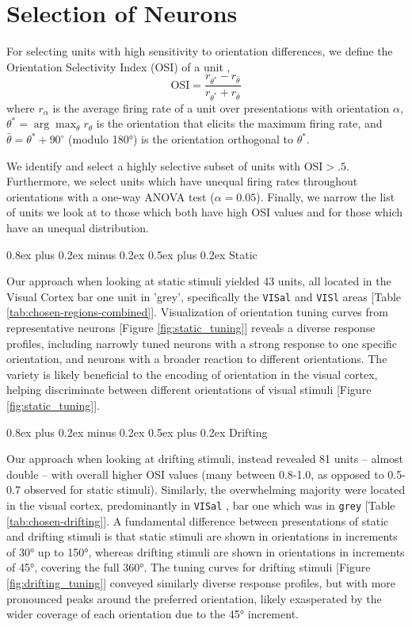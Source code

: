 \documentclass[10pt,twocolumn]{article}
\makeatletter
\renewcommand{\subsection}{\@startsection{subsection}{2}{\z@}%
  {0.8ex plus 0.2ex minus 0.2ex}%
  {0.5ex plus 0.2ex}%
{\normalfont\normalsize\bfseries}}
\makeatother
\begin{document}
\section{Selection of Neurons}

For selecting units with high sensitivity to orientation differences, we define the Orientation Selectivity Index (OSI) of a unit \cite{ringach2002orientation},
\[\textrm{OSI} = \frac{r_{\theta^*} - r_{\bar\theta}}{r_{\theta^*} + r_{\bar\theta}}\]
where $r_\alpha$ is the average firing rate of a unit over presentations with orientation $\alpha$, $\theta^* = \arg\max_\theta r_\theta$ is the orientation that elicits the maximum firing rate, and $\bar{\theta} = \theta^* + 90^\circ$ (modulo 180°) is the orientation orthogonal to $\theta^*$.

We identify and select a highly selective subset of units with \(\textrm{OSI} > .5\).  Furthermore, we select units which have unequal firing rates throughout orientations with a one-way ANOVA test (\(\alpha = 0.05\)).  Finally, we narrow the list of units we look at to those which both have high OSI values and for those which have an unequal distribution.

\subsection{Static}

Our approach when looking at static stimuli yielded 43 units, all located in the Visual Cortex bar one unit in 'grey', specifically the \texttt{VISal} and \texttt{VISl} areas [Table \ref{tab:chosen-regions-combined}].  
Visualization of orientation tuning curves from representative neurons [Figure \ref{fig:static_tuning}] reveals a diverse response profiles, including narrowly tuned neurons with a strong response to one specific orientation, and neurons with a broader reaction to different orientations.
The variety is likely beneficial to the encoding of orientation in the visual cortex, helping discriminate between different orientations of visual stimuli [Figure \ref{fig:static_tuning}].

\subsection{Drifting}

Our approach when looking at drifting stimuli, instead revealed 81 units -- almost double -- with overall higher OSI values (many between 0.8-1.0, as opposed to 0.5-0.7 observed for static stimuli). Similarly, the overwhelming majority were located in the visual cortex, predominantly in \texttt{VISal} \cite{wang2007area}, bar one which was in \texttt{grey} [Table \ref{tab:chosen-drifting}]. A fundamental difference between presentations of static and drifting stimuli is that static stimuli are shown in orientations in increments of 30° up to 150°, whereas drifting stimuli are shown in orientations in increments of 45°, covering the full 360°. The tuning curves for drifting stimuli [Figure \ref{fig:drifting_tuning}] conveyed similarly diverse response profiles, but with more pronounced peaks around the preferred orientation, likely exasperated by the wider coverage of each orientation due to the 45° increment.
\end{document}
